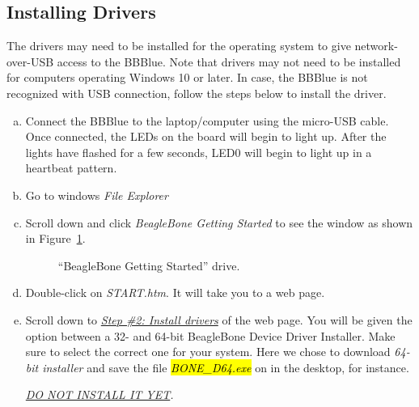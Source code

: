 \subsection{Installing Drivers}
\label{sec:drivers}

The drivers may need to be installed for the operating system to give
network-over-USB access to the BBBlue. Note that drivers may not need to be
installed for computers operating Windows 10 or later. In case, the BBBlue is
not recognized with USB connection, follow the steps below to install the
driver. 

\begin{enumerate}[a)]
\item  Connect the BBBlue to the laptop/computer using the micro-USB cable. Once connected, the LEDs on the board will begin to light up. After the lights have flashed for a few seconds, LED0 will begin to light up in a heartbeat pattern. 

\item Go to windows \emph{File Explorer}
  
\item Scroll down and  click \emph{BeagleBone Getting Started} to see the window as shown in Figure~\ref{fig:BBBlue-Start}. %
\begin{figure}
    \centering
    \caption{``BeagleBone Getting Started'' drive.}
    \label{fig:BBBlue-Start}
\end{figure}
%
\item Double-click on \emph{START.htm}.  It will take you to a web page.
\item Scroll down to \emph{\underline{Step \#2: Install drivers}} of the web
  page. You will be given the option between a 32- and 64-bit BeagleBone Device
  Driver Installer. Make sure to select the correct one for your system. Here we
  chose to download \emph{64-bit installer} and save the
  file \hl{\emph{BONE\_D64.exe}} on in the desktop, for instance.
  
  \emph{\uppercase{\underline{do not install it yet}}.}

\end{enumerate}

